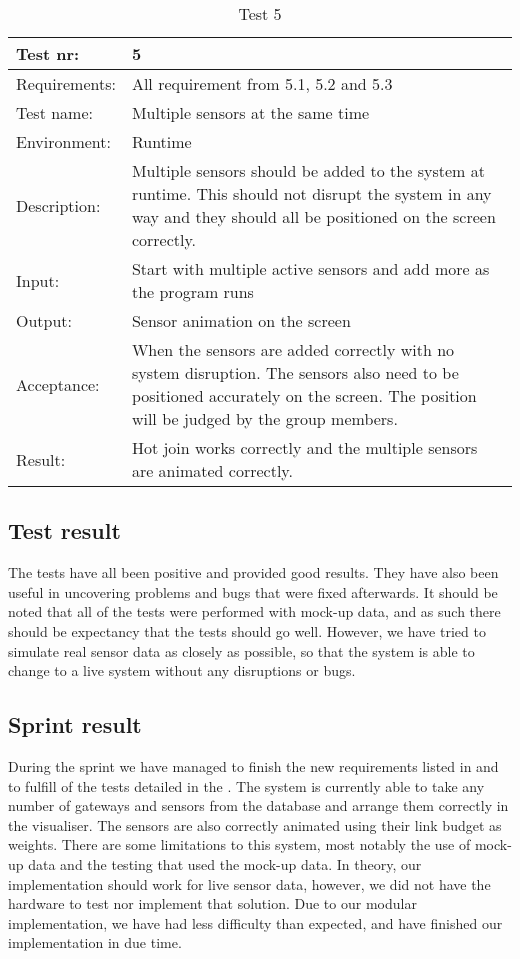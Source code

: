 \documentclass[../document]{subfiles}
\begin{document}
\begin{table}[H]
\caption{Test 5}
\centering
\begin{tabularx}{\textwidth}{|l|X|}
\hline
Test nr:
&5
\\ \hline Requirements:
&All requirement from 5.1, 5.2 and 5.3
\\ \hline Test name:
&Multiple sensors at the same time
\\ \hline Environment:
&Runtime
\\ \hline Description:
&Multiple sensors should be added to the system at runtime. This should not disrupt the system in any way and they should all be positioned on the screen correctly.
\\ \hline Input:
&Start with multiple active sensors and add more as the program runs
\\ \hline Output:
&Sensor animation on the screen
\\ \hline Acceptance:
&When the sensors are added correctly with no system disruption. The sensors also need to be positioned accurately on the screen. The position will be judged by the group members.
\\ \hline Result:
&Hot join works correctly and the multiple sensors are animated correctly.
\\ \hline 
\end{tabularx}
\end{table}


\subsection{Test result}

The tests have all been positive and provided good results. They have also been useful in uncovering problems and bugs that were fixed afterwards. It should be noted that all of the tests were performed with mock-up data, and as such there should be expectancy that the tests should go well. However, we have tried to simulate real sensor data as closely as possible, so that the system is able to change to a live system without any disruptions or bugs. 

\subsection{Sprint result}

During the sprint we have managed to finish the new requirements listed in  and to fulfill of the tests detailed in the  . The system is currently able to take any number of gateways and sensors from the database and arrange them correctly in the visualiser. The sensors are also correctly animated using their link budget as weights. There are some limitations to this system, most notably the use of mock-up data and the testing that used the mock-up data. In theory, our implementation should work for live sensor data, however, we did not have the hardware to test nor implement that solution. Due to our modular implementation, we have had less difficulty than expected, and have finished our implementation in due time.
\end{document}
